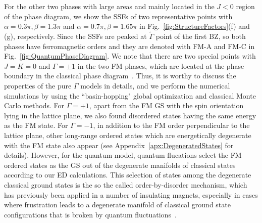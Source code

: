 \documentclass[aps,prb,reprint,amsfonts,amsmath,amssymb,showpacs,groupedaddress,superscriptaddress]{revtex4-1}
\begin{document}
For the other two phases with large areas and mainly located in the $J<0$ region of the phase diagram, we show the SSFs of two representative points with $\alpha=0.3\pi, \beta=1.3\pi$ and $\alpha=0.7\pi, \beta=1.65\pi$ in Fig.~\ref{fig:StructureFactors}(f) and (g), respectively. Since the SSFs are peaked at $\tilde{\Gamma}$ point of the first BZ, so both phases have ferromagnetic orders and they are denoted with FM-A and FM-C in Fig.~\ref{fig:QuantumPhaseDiagram}. We note that there are two special points with $J=K=0$ and $\Gamma=\pm1$ in the two FM phases, which are located at the phase boundary in the classical phase diagram~\cite{PhysRevB.92.165108}. Thus, it is worthy to discuss the properties of the pure $\Gamma$ models in details, and we perform the numerical simulations by using the ``basin-hopping" global optimization and classical Monte Carlo methods. For $\Gamma=+1$, apart from the FM GS with the spin orientation lying in the lattice plane, we also found disordered states having the same energy as the FM state. For $\Gamma=-1$, in addition to the FM order perpendicular to the lattice plane, other long-range ordered states which are energetically degenerate with the FM state also appear (see Appendix~\ref{apx:DegeneratedStates} for details). However, for the quantum model, quantum flucations select the FM ordered states as the GS out of the degenerate manifolds of classical states according to our ED calculations. This selection of states among the degenerate classical ground states is the so the called order-by-disorder mechanism, which has previously been applied in a number of insulating magnets, especially in cases where frustration leads to a degenerate manifold of classical ground state configurations that is broken by quantum fluctuations~\cite{JPSJ.54.4494,PhysRevLett.62.2056,PhysRevLett.88.067203,PhysRevB.81.214419,PhysRevLett.109.077204}.
\end{document}
